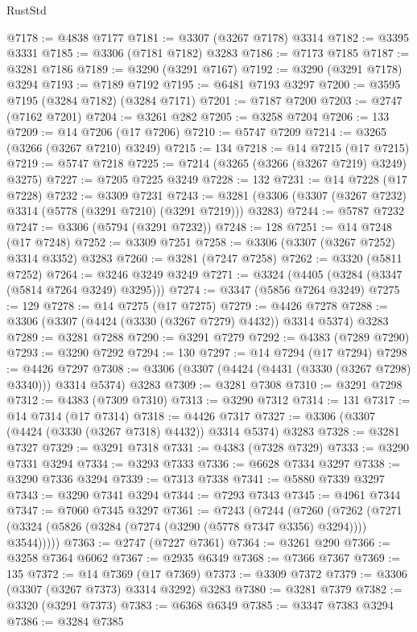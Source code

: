 \begin{lexlean}{RustStd}
\begin{coremodule}
@7178 := @4838 @7177
@7181 := @3307 (@3267 @7178) @3314
@7182 := @3395 @3331
@7185 := @3306 (@7181 @7182) @3283
@7186 := @7173 @7185
@7187 := @3281 @7186
@7189 := @3290 (@3291 @7167)
@7192 := @3290 (@3291 @7178) @3294
@7193 := @7189 @7192
@7195 := @6481 @7193 @3297
@7200 := @3595 @7195 (@3284 @7182) (@3284 @7171)
@7201 := @7187 @7200
@7203 := @2747 (@7162 @7201)
@7204 := @3261 @282
@7205 := @3258 @7204
@7206 := 133
@7209 := @14 @7206 (@17 @7206)
@7210 := @5747 @7209
@7214 := @3265 (@3266 (@3267 @7210) @3249)
@7215 := 134
@7218 := @14 @7215 (@17 @7215)
@7219 := @5747 @7218
@7225 := @7214 (@3265 (@3266 (@3267 @7219) @3249) @3275)
@7227 := @7205 @7225 @3249
@7228 := 132
@7231 := @14 @7228 (@17 @7228)
@7232 := @3309 @7231
@7243 := @3281 (@3306 (@3307 (@3267 @7232) @3314 (@5778 (@3291 @7210) (@3291 @7219))) @3283)
@7244 := @5787 @7232
@7247 := @3306 (@5794 (@3291 @7232))
@7248 := 128
@7251 := @14 @7248 (@17 @7248)
@7252 := @3309 @7251
@7258 := @3306 (@3307 (@3267 @7252) @3314 @3352) @3283
@7260 := @3281 (@7247 @7258)
@7262 := @3320 (@5811 @7252)
@7264 := @3246 @3249 @3249
@7271 := @3324 (@4405 (@3284 (@3347 (@5814 @7264 @3249) @3295)))
@7274 := @3347 (@5856 @7264 @3249)
@7275 := 129
@7278 := @14 @7275 (@17 @7275)
@7279 := @4426 @7278
@7288 := @3306 (@3307 (@4424 (@3330 (@3267 @7279) @4432)) @3314 @5374) @3283
@7289 := @3281 @7288
@7290 := @3291 @7279
@7292 := @4383 (@7289 @7290)
@7293 := @3290 @7292
@7294 := 130
@7297 := @14 @7294 (@17 @7294)
@7298 := @4426 @7297
@7308 := @3306 (@3307 (@4424 (@4431 (@3330 (@3267 @7298) @3340))) @3314 @5374) @3283
@7309 := @3281 @7308
@7310 := @3291 @7298
@7312 := @4383 (@7309 @7310)
@7313 := @3290 @7312
@7314 := 131
@7317 := @14 @7314 (@17 @7314)
@7318 := @4426 @7317
@7327 := @3306 (@3307 (@4424 (@3330 (@3267 @7318) @4432)) @3314 @5374) @3283
@7328 := @3281 @7327
@7329 := @3291 @7318
@7331 := @4383 (@7328 @7329)
@7333 := @3290 @7331 @3294
@7334 := @3293 @7333
@7336 := @6628 @7334 @3297
@7338 := @3290 @7336 @3294
@7339 := @7313 @7338
@7341 := @5880 @7339 @3297
@7343 := @3290 @7341 @3294
@7344 := @7293 @7343
@7345 := @4961 @7344
@7347 := @7060 @7345 @3297
@7361 := @7243
    (@7244
      (@7260
        (@7262 (@7271 (@3324 (@5826 (@3284 (@7274 (@3290 (@5778 @7347 @3356) @3294)))) @3544)))))
@7363 := @2747 (@7227 @7361)
@7364 := @3261 @290
@7366 := @3258 @7364 @6062
@7367 := @2935 @6349
@7368 := @7366 @7367
@7369 := 135
@7372 := @14 @7369 (@17 @7369)
@7373 := @3309 @7372
@7379 := @3306 (@3307 (@3267 @7373) @3314 @3292) @3283
@7380 := @3281 @7379
@7382 := @3320 (@3291 @7373)
@7383 := @6368 @6349
@7385 := @3347 @7383 @3294
@7386 := @3284 @7385

\end{coremodule}
\end{lexlean}
